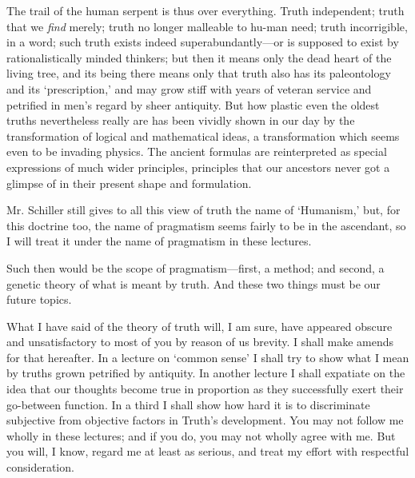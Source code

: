 The trail of the human serpent is thus over everything. Truth
independent; truth that we \textit{find} merely; truth no longer
malleable to hu-man need; truth incorrigible, in a word; such
truth exists indeed su\-per\-a\-bun\-dant\-ly---or is supposed to
exist by rationalistically minded thinkers; but then it means only the
dead heart of the living tree, and its being there means only that
truth also has its paleontology and its `prescription,' and may grow
stiff with years of veteran service and petrified in men's regard by
sheer antiquity. But how plastic even the oldest truths nevertheless
really are has been vividly shown in our day by the transformation of
logical and mathematical ideas, a transformation which seems even to
be invading physics. The ancient formulas are reinterpreted as special
expressions of much wider principles, principles that our ancestors
never got a glimpse of in their present shape and formulation.

Mr. Schiller still gives to all this view of truth the name of
`Humanism,' but, for this doctrine too, the name of pragmatism seems
fairly to be in the ascendant, so I will treat it under the name of
pragmatism in these lectures.

Such then would be the scope of prag\-ma\-tism---first, a method; and
second, a genetic theory  of what is meant by truth. And
these two things must be our future topics.

What I have said of the theory of truth will, I am sure, have appeared
obscure and unsatisfactory to most of you by reason of us brevity. I
shall make amends for that hereafter. In a lecture on `common sense' I
shall try to show what I mean by truths grown petrified by antiquity.
In another lecture I shall expatiate on the idea that our thoughts
become true in proportion as they successfully exert their go-between
function. In a third I shall show how hard it is to discriminate
subjective from objective factors in Truth's development. You may not
follow me wholly in these lectures; and if you do, you may not wholly
agree with me. But you will, I know, regard me at least as serious,
and treat my effort with respectful consideration.


